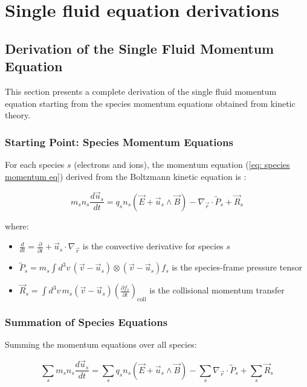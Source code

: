 \chapter{Single fluid equation derivations}
\section{Derivation of the Single Fluid Momentum Equation}\label{sec:Derivation of the Single Fluid Momentum Equation}

This section presents a complete derivation of the single fluid momentum equation starting from the species momentum equations obtained from kinetic theory.

\subsection{Starting Point: Species Momentum Equations}

For each species $s$ (electrons and ions), the momentum equation (\ref{eq: species momentum eq}) derived from the Boltzmann kinetic equation is :

\begin{equation*}
m_s n_s \frac{d\vec{u}_s}{dt} = q_s n_s (\vec{E} + \vec{u}_s \wedge \vec{B}) - \nabla_{\vec{r}} \cdot \overleftrightarrow{P}_s + \vec{R}_s
\end{equation*}

where:
\begin{itemize}
\item $\displaystyle \frac{d}{dt} = \frac{\partial}{\partial t} + \vec{u}_s \cdot \nabla_{\vec{r}}$ is the convective derivative for species $s$
\item $\displaystyle \overleftrightarrow{P}_s = m_s \int d^3v \, (\vec{v} - \vec{u}_s) \otimes (\vec{v} - \vec{u}_s) f_s$ is the species-frame pressure tensor
\item $\displaystyle \vec{R}_s = \int d^3v \, m_s (\vec{v} - \vec{u}_s) \left(\frac{\partial f_s}{\partial t}\right)_{\text{coll}}$ is the collisional momentum transfer
\end{itemize}

\subsection{Summation of Species Equations}

Summing the momentum equations over all species:

\begin{equation*}
\sum_s m_s n_s \frac{d\vec{u}_s}{dt} = \sum_s q_s n_s (\vec{E} + \vec{u}_s \wedge \vec{B}) - \sum_s \nabla_{\vec{r}} \cdot \overleftrightarrow{P}_s + \sum_s \vec{R}_s
\end{equation*}

